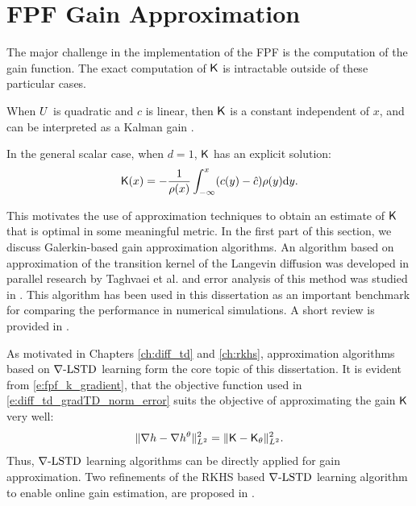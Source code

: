 \section{FPF Gain Approximation}
The major challenge in the implementation of the FPF is the computation of the gain function. The exact computation of $\text{\sf K}$ is intractable outside of these particular cases. 
\begin{romannum}
\item When $U$ is quadratic and $c$ is linear,  then $\text{\sf K}$ is a constant independent of $x$, and can be interpreted as a Kalman gain \cite{yanlaumehmey13}. 

\item In the general scalar case, when $d=1$, $\text{\sf K}$ has an explicit solution:
\begin{equation}
\kFPF(x) = - \frac{1}{\pr(x)} \int_{-\infty}^{x} (c(y) - \hat{c}) \pr(y) \ud y.
\label{e:fpf_gain_1d}
\end{equation}
\end{romannum}

This motivates the use of approximation techniques to obtain an estimate of $\text{\sf K}$ that is optimal in some meaningful metric. In the first part of this section, we discuss Galerkin-based gain approximation algorithms. An algorithm based on approximation of the transition kernel of the Langevin diffusion was developed in parallel research by Taghvaei et al. \cite{tagmeh16} and error analysis of this method was studied in \cite{tagmehmey17}. This algorithm has been used in this dissertation as an important benchmark for comparing the performance in numerical simulations. A short review is provided in . 

As motivated in Chapters \ref{ch:diff_td} and \ref{ch:rkhs}, approximation algorithms based on $\nabla\text{-LSTD}$ learning form the core topic of this dissertation. It is evident from \eqref{e:fpf_k_gradient}, that the objective function used in \eqref{e:diff_td_gradTD_norm_error} suits the objective of approximating the gain $\text{\sf K}$ very well:
\begin{equation}
\| \nabla h - \nabla h^\theta \|^2_{L^2} = \| \text{\sf K} - \text{\sf K}_\theta \|^2_{L^2}.
\end{equation}
Thus, $\nabla\text{-LSTD}$ learning algorithms can be directly applied for gain approximation. Two refinements of the RKHS based $\nabla\text{-LSTD}$ learning algorithm to enable online gain estimation, are proposed in .

